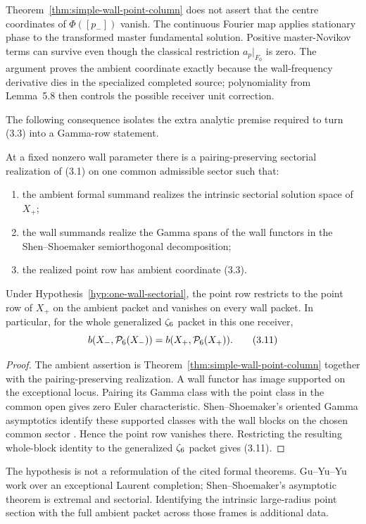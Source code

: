 \begin{warning}\label{warn:center-coordinates}
Theorem~\ref{thm:simple-wall-point-column} does not assert that the centre
coordinates of \(\Phi([p_-])\) vanish.  The continuous Fourier map applies
stationary phase to the transformed master fundamental solution.  Positive
master-Novikov terms can survive even though the classical restriction
\(a_p|_{F_0}\) is zero.  The argument proves the ambient coordinate exactly
because the wall-frequency derivative dies in the specialized completed
source; polynomiality from Lemma~5.8 then controls the possible receiver
unit correction.
\end{warning}

The following consequence isolates the extra analytic premise required to
turn (3.3) into a Gamma-row statement.

\begin{hypothesis}
\label{hyp:one-wall-sectorial}
At a fixed nonzero wall parameter there is a pairing-preserving sectorial
realization of (3.1) on one common admissible sector such that:
\begin{enumerate}[label=\textup{(\alph*)}]
\item the ambient formal summand realizes the intrinsic sectorial solution
  space of \(X_+\);
\item the wall summands realize the Gamma spans of the wall functors in the
  Shen--Shoemaker semiorthogonal decomposition;
\item the realized point row has ambient coordinate (3.3).
\end{enumerate}
\end{hypothesis}

\begin{corollary}
\label{cor:simple-wall-rank}
Under Hypothesis~\ref{hyp:one-wall-sectorial}, the point row restricts to the
point row of \(X_+\) on the ambient packet and vanishes on every wall packet.
In particular, for the whole generalized \(\zeta_{6}\) packet in this one
receiver,
\[
 b(X_-,\mathcal P_6(X_-))=b(X_+,\mathcal P_6(X_+)).                       \tag{3.11}
\]
\end{corollary}

\begin{proof}
The ambient assertion is Theorem~\ref{thm:simple-wall-point-column} together
with the pairing-preserving realization.  A wall functor has image supported
on the exceptional locus.  Pairing its Gamma class with the point class in
the common open gives zero Euler characteristic.  Shen--Shoemaker's oriented
Gamma asymptotics identify these supported classes with the wall blocks on
the chosen common sector \cite{ShenShoemaker}.  Hence the point row vanishes
there.  Restricting the resulting whole-block identity to the generalized
\(\zeta_{6}\) packet gives (3.11).
\end{proof}

The hypothesis is not a reformulation of the cited formal theorems.
Gu--Yu--Yu work over an exceptional Laurent completion; Shen--Shoemaker's
asymptotic theorem is extremal and sectorial.  Identifying the intrinsic
large-radius point section with the full ambient packet across those frames
is additional data.
